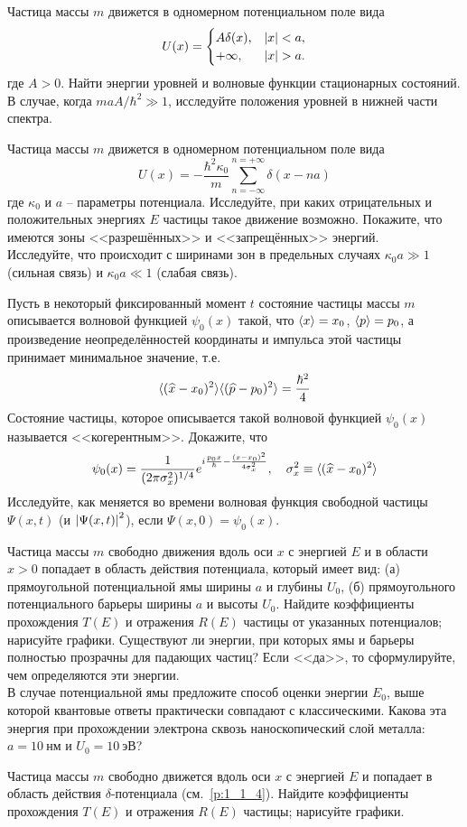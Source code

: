 \begin{problem}
%
\item\label{p:1_1_9}%
Частица массы $m$ движется в одномерном потенциальном поле вида
$$
U(x) =
\begin{cases}
A\delta(x), & \left\lvert{x}\right\rvert < a,\\
+\infty, & \left\lvert{x}\right\rvert > a.
\end{cases}
$$%
где $A > 0$. Найти энергии уровней и волновые функции стационарных состояний. В случае, когда $maA/\hbar^2 \gg 1$, исследуйте положения уровней в нижней части спектра.
%
\item\label{p:1_1_10}%
Частица массы $m$ движется в одномерном потенциальном поле вида
$$
U(x) = -\frac{\hbar^2 \kappa_0}{m} \sum_{n=-\infty}^{n=+\infty} \delta(x - na)
$$%
%
где $\kappa_0$ и $a$ -- параметры потенциала. Исследуйте, при каких отрицательных и положительных энергиях $E$ частицы такое движение возможно. Покажите, что имеются зоны <<разрешённых>> и <<запрещённых>> энергий.\\
Исследуйте, что происходит с ширинами зон в предельных случаях $\kappa_0 a \gg 1$ (сильная связь) и $\kappa_0 a \ll 1$ (слабая связь).
%
\item\label{p:1_1_11}%
Пусть в некоторый фиксированный момент $t$ состояние частицы массы $m$ описывается волновой функцией $\psi_0(x)$ такой, что $\langle{x}\rangle = x_0$, $\langle{p}\rangle = p_0$, а произведение неопределённостей координаты и импульса этой частицы принимает минимальное значение, т.е.
$$
\langle{(\widehat{x} - x_0)^2}\rangle \langle{(\widehat{p} - p_0)^2}\rangle = \frac{\hbar^2}{4}
$$%
%
Состояние частицы, которое описывается такой волновой функцией $\psi_0(x)$ называется <<когерентным>>. Докажите, что
$$
\psi_0(x) =
  \frac{1}{(2\pi\sigma^{2}_{x})^{1/4}}
  e^{i\frac{p_0 x}{\hbar} - \frac{(x - x_0)^2}{4\sigma^{2}_{x}}}, ~~~
  \sigma^2_x \equiv \langle{(\widehat{x} - x_0)^2}\rangle
$$%
%
Исследуйте, как меняется во времени волновая функция свободной частицы $\Psi(x, t)$ (и $\left\lvert{\Psi(x, t)}\right\rvert^2$), если $\Psi(x, 0) = \psi_0(x)$.
%
\item\label{p:1_1_12}%
Частица массы $m$ свободно движения вдоль оси $x$ с энергией $E$ и в области $x > 0$ попадает в область действия потенциала, который имеет вид: (а) прямоугольной потенциальной ямы ширины $a$ и глубины $U_0$, (б) прямоугольного потенциального барьеры ширины $a$ и высоты $U_0$. Найдите коэффициенты прохождения $T(E)$ и отражения $R(E)$ частицы от указанных потенциалов; нарисуйте графики. Существуют ли энергии, при которых ямы и барьеры полностью прозрачны для падающих частиц? Если <<да>>, то сформулируйте, чем определяются эти энергии.\\
В случае потенциальной ямы предложите способ оценки энергии $E_0$, выше которой квантовые ответы практически совпадают с классическими. Какова эта энергия при прохождении электрона сквозь наноскопический слой металла: $a = 10~\text{нм}$ и $U_0 = 10~\text{эВ}$?
%
\item\label{p:1_1_13}%
Частица массы $m$ свободно движется вдоль оси $x$ с энергией $E$ и попадает в область действия $\delta$-потенциала (см.~\cref{p:1_1_4}). Найдите коэффициенты прохождения $T(E)$ и отражения $R(E)$ частицы; нарисуйте графики.
\end{problem}


